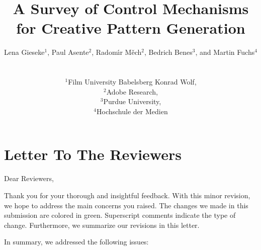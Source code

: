 \documentclass{egpubl}
\title[A Survey of Control Mechanisms for Creative Pattern Generation]%
      {A Survey of Control Mechanisms for Creative Pattern Generation}
\author[L. Gieseke, P. Asente, R. Mech, B. Benes, M. Fuchs]
{\parbox{\textwidth}{\centering Lena Gieseke$^{1}$, Paul Asente$^{2}$, Radom\'{\i}r M\v{e}ch$^{2}$, Bedrich Benes$^{3}$, and Martin Fuchs$^{4}$}
        \\
{\parbox{\textwidth}{\centering $^1$Film University Babelsberg Konrad Wolf,\\
         $^2$Adobe Research,\\
         $^3$Purdue University,\\
         $^4$Hochschule der Medien
       }
}
}
\begin{document}
\onecolumn %



\maketitle




\section*{Letter To The Reviewers}

Dear Reviewers,


Thank you for your thorough and insightful feedback. With this minor revision, we hope to address the main concerns you raised. The changes we made in this submission are colored in green. Superscript comments indicate the type of change. Furthermore, we summarize our revisions in this letter.

In summary, we addressed the following issues:


\end{document}
